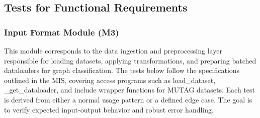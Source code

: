 \documentclass[12pt, titlepage]{article}
\begin{document}
\subsection{Tests for Functional Requirements}
\label{sub:unit FR}
\subsubsection{Input Format Module (M3)}

This module corresponds to the data ingestion and preprocessing layer responsible for loading datasets, applying transformations, and preparing batched dataloaders for graph classification. The tests below follow the specifications outlined in the MIS, covering access programs such as load\_dataset, \_get\_dataloader, and include wrapper functions for MUTAG datasets. Each test is derived from either a normal usage pattern or a defined edge case. The goal is to verify expected input-output behavior and robust error handling.
\end{document}
